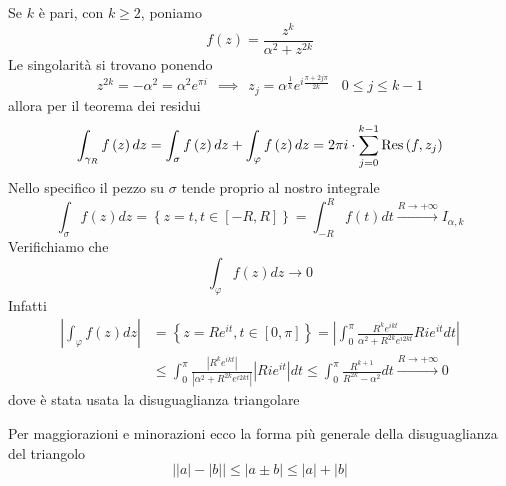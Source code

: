 Se $k$ è pari, con $k \geq 2$, poniamo
\begin{equation*}
f\left(z\right) = \frac{z^{k}}{\alpha^{2} + z^{2k}}
\end{equation*}
Le singolarità si trovano ponendo
\begin{equation*}
z^{2k} = - \alpha^{2} = \alpha^{2} e^{\pi i} \ \ \implies \ \ z_{j} = \alpha^{\frac{1}{k}} e^{i\frac{\pi + 2j\pi}{2k}} \ \ \ \ 0 \leq j \leq k - 1
\end{equation*}
allora per il teorema dei residui
\begin{equation*}
\int_{\gamma_{R}} f\left(z\right) dz = \int_{\sigma} f\left(z\right) dz + \int_{\varphi} f\left(z\right) dz = 2\pi i \cdot \sum\limits^{k - 1}_{j = 0}\operatorname{Res} \left(f, z_{j}\right)
\end{equation*}
Nello specifico il pezzo su $\sigma $ tende proprio al nostro integrale
\begin{equation*}
\int_{\sigma} f\left(z\right) dz = \left\{z = t, t\in \left[ - R, R\right]\right\} = \int^{R}_{- R} f\left(t\right) dt\xrightarrow{R\rightarrow + \infty} I_{\alpha, k}
\end{equation*}
Verifichiamo che
\begin{equation*}
\int_{\varphi} f\left(z\right) dz\rightarrow 0
\end{equation*}
Infatti
\begin{align*}
\left| \int_{\varphi} f\left(z\right) dz\right|  & = \left\{z = Re^{it}, t\in \left[ 0, \pi \right]\right\} = \left| \int^{\pi}_{0}\frac{R^{k} e^{ikt}}{\alpha^{2} + R^{2k} e^{i2kt}} Rie^{it} dt\right| \\
 & \leq \int^{\pi}_{0}\frac{\left| R^{k} e^{ikt}\right|}{\left| \alpha^{2} + R^{2k} e^{i2kt}\right|}\left| Rie^{it}\right| dt \leq \int^{\pi}_{0}\frac{R^{k + 1}}{R^{2k} - \alpha^{2}} dt\xrightarrow{R\rightarrow + \infty} 0
\end{align*}
dove è stata usata la disuguaglianza triangolare
\begin{rem}
 Per maggiorazioni e minorazioni ecco la forma più generale della disuguaglianza del triangolo
\begin{equation*}
\left| \left| a\right| - \left| b\right| \right| \leq \left| a\pm b\right| \leq \left| a\right| + \left| b\right| 
\end{equation*}
\end{rem}

